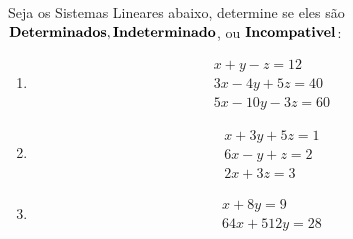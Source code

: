 \begin{exeresol}
        \begin{flushleft}
        Seja os Sistemas Lineares abaixo, determine se eles são $ \bf { Determinados , Indeterminado}$, ou $\bf{Incompativel}$:
        \end{flushleft}
        \begin{enumerate}
            \item \begin{equation*}
                    \begin{array}{cccccccc}\label{eq:sistema_A}
                        x + y - z = 12 \\
                        3x - 4y + 5z = 40 \\
                        5x - 10y - 3z = 60
                    \end{array}
            \end{equation*}
            \item \begin{equation*}
                    \begin{array}{cccccccc}\label{eq:sistema_B}
                        x + 3y + 5z = 1 \\
                        6x - y + z = 2 \\
                        2x + 3z = 3
                    \end{array}
                \end{equation*}
            \item \begin{equation*}
                \begin{array}{cccccccc}\label{eq:sistema_C}
                    x + 8y = 9  \\
                    64x + 512y = 28
                \end{array}
        \end{equation*}
        \end{enumerate}
\end{exeresol}
